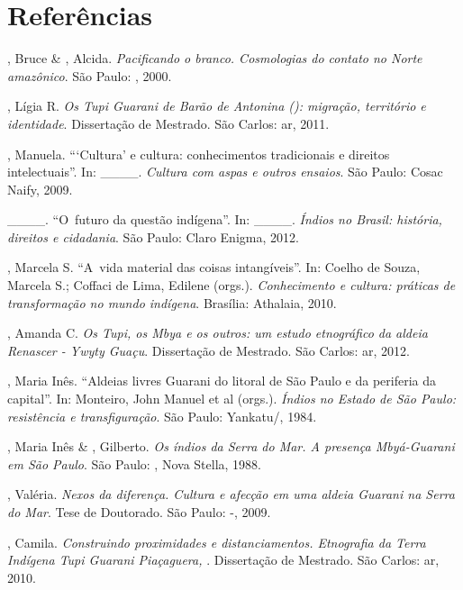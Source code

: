 \section{Referências}

\begin{Parskip}
, Bruce \& , Alcida. \emph{Pacificando o branco. Cosmologias do
contato no Norte amazônico}. São Paulo: , 2000.

, Lígia R. \emph{Os Tupi Guarani de Barão de Antonina (): migração,
território e identidade}. Dissertação de Mestrado. São Carlos: ar,
2011.

, Manuela. ``‘Cultura’ e cultura: conhecimentos
tradicionais e direitos intelectuais''. In: \_\_\_\_. \emph{Cultura com aspas e outros
ensaios}. São Paulo: Cosac Naify, 2009. 

\_\_\_\_. ``O~futuro da questão indígena''. In: \_\_\_\_. \emph{Índios no Brasil: história,
direitos e cidadania}. São Paulo: Claro Enigma, 2012.

, Marcela S. ``A~vida material das coisas intangíveis''.
In: Coelho de Souza, Marcela S.; Coffaci de Lima, Edilene (orgs.).
\emph{Conhecimento e cultura: práticas de transformação no mundo indígena}.
Brasília: Athalaia, 2010.

, Amanda C. \emph{Os Tupi, os Mbya e os outros: um estudo etnográfico da
aldeia Renascer - Ywyty Guaçu}. Dissertação de Mestrado. São Carlos:
ar, 2012. 

, Maria Inês. ``Aldeias livres Guarani do litoral de São Paulo e
da periferia da capital''. In: Monteiro, John Manuel et al (orgs.).
\emph{Índios no Estado de São Paulo: resistência e transfiguração}. São Paulo:
Yankatu/, 1984.

, Maria Inês \& , Gilberto. \emph{Os índios da Serra do Mar. A
presença Mbyá-Guarani em São Paulo}. São Paulo: , Nova Stella, 1988.

, Valéria. \emph{Nexos da diferença. Cultura e afecção em uma aldeia
Guarani na Serra do Mar}. Tese de Doutorado. São Paulo: -,
2009.

, Camila. \emph{Construindo proximidades e distanciamentos. Etnografia
da Terra Indígena Tupi Guarani Piaçaguera, }. Dissertação de Mestrado.
São Carlos: ar, 2010.


\end{Parskip}
